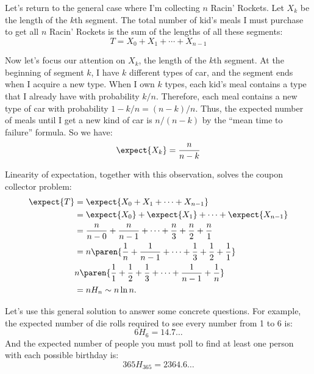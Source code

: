 Let's return to the general case where I'm collecting $n$ Racin'
Rockets.  Let $X_k$ be the length of the $k$th segment.  The total
number of kid's meals I must purchase to get all $n$ Racin' Rockets is
the sum of the lengths of all these segments:
%
\[
T = X_0 + X_1 + \cdots + X_{n-1}
\]

Now let's focus our attention on $X_k$, the length of the $k$th segment.
At the beginning of segment $k$, I have $k$ different types of car, and
the segment ends when I acquire a new type.  When I own $k$ types, each
kid's meal contains a type that I already have with probability $k / n$.
Therefore, each meal contains a new type of car with probability $1 - k /
n = (n - k) / n$.  Thus, the expected number of meals until I get a new
kind of car is $n / (n - k)$ by the ``mean time to failure'' formula.  So
we have:
%
\[
\expect{X_k} = \frac{n}{n - k}
\]

Linearity of expectation, together with this observation, solves the
coupon collector problem:
%
\begin{align*}
\expect{T} & = \expect{X_0 + X_1 + \cdots + X_{n-1}} \\ & = \expect{X_0} +
  \expect{X_1} + \cdots + \expect{X_{n-1}} \\ & = \frac{n}{n - 0} +
  \frac{n}{n - 1} + \cdots + \frac{n}{3} + \frac{n}{2} + \frac{n}{1} \\ &
  = n \paren{\frac{1}{n} + \frac{1}{n-1} + \cdots + \frac{1}{3} +
  \frac{1}{2} + \frac{1}{1}} \\ & n \paren{\frac{1}{1} + \frac{1}{2} +
  \frac{1}{3} + \cdots + \frac{1}{n-1} + \frac{1}{n}}\\
  & = n H_n \sim n \ln n.
\end{align*}

Let's use this general solution to answer some concrete questions.
For example, the expected number of die rolls required to see every
number from 1 to 6 is:
%
\[
6 H_6 = 14.7 \dots
\]
%
And the expected number of people you must poll to find at least one
person with each possible birthday is:
%
\[
365 H_{365} = 2364.6\dots
\]

